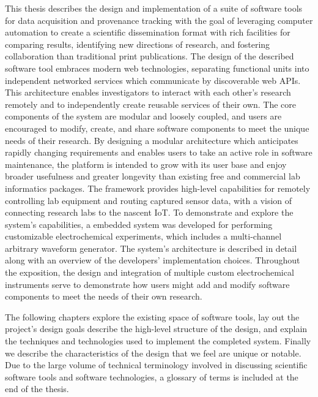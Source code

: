 \documentclass[../thesis]{subfiles}
\begin{document}
This thesis describes the design and implementation of a suite of
software tools for data acquisition and provenance tracking with the
goal of leveraging computer automation to create a scientific
dissemination format with rich facilities for comparing results,
identifying new directions of research, and fostering collaboration
than traditional print publications. The design of the described
software tool embraces modern web technologies, separating functional
units into independent networked services which communicate by
discoverable web \glspl{API}. This architecture enables investigators
to interact with each other's research remotely and to independently
create reusable services of their own. The core components of the
system are modular and loosely coupled, and users are encouraged to
modify, create, and share software components to meet the unique needs
of their research. By designing a modular architecture which
anticipates rapidly changing requirements and enables users to take an
active role in software maintenance, the platform is intended to grow
with its user base and enjoy broader usefulness and greater longevity
than existing free and commercial lab informatics packages.  The
framework provides high-level capabilities for remotely controlling
lab equipment and routing captured sensor data, with a vision of
connecting research labs to the nascent \gls{IoT}. To demonstrate and
explore the system's capabilities, a embedded system was developed for
performing customizable electrochemical experiments, which includes a
multi-channel arbitrary waveform generator. The system's architecture
is described in detail along with an overview of the developers'
implementation choices. Throughout the exposition, the design and
integration of multiple custom electrochemical instruments serve to
demonstrate how users might add and modify software components to meet
the needs of their own research.

The following chapters explore the existing space of software tools,
lay out the project's design goals describe the high-level structure
of the design, and explain the techniques and technologies used to
implement the completed system. Finally we describe the
characteristics of the design that we feel are unique or notable. Due
to the large volume of technical terminology involved in discussing
scientific software tools and software technologies, a glossary of
terms is included at the end of the thesis.
\end{document}
